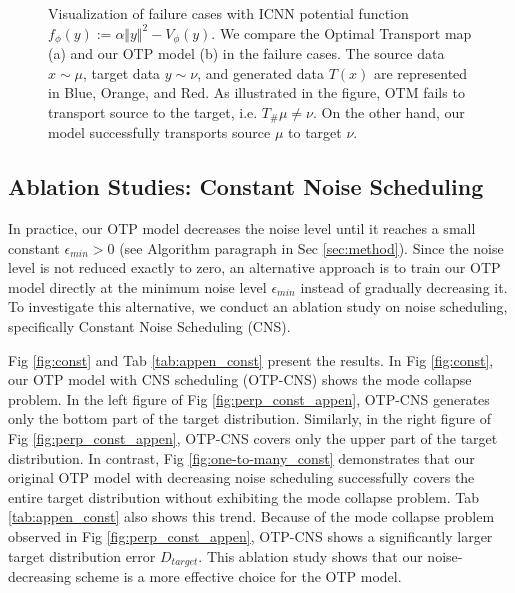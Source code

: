 \begin{figure}[h]
    \centering
    \hfill
    \vspace{-10pt}
    \caption{Visualization of failure cases with ICNN potential function $f_\phi(y) := \alpha \Vert y \Vert^2 - V_\phi(y)  $. We compare the Optimal Transport map (a) and our OTP model (b) in the failure cases. The source data $x \sim \mu$, target data $y \sim \nu$, and generated data $T(x)$ are represented in Blue, Orange, and Red. As illustrated in the figure, OTM fails to transport source to the target, i.e. $T_\# \mu \neq \nu$. On the other hand, our model successfully transports source $\mu$ to target $\nu$.}
    \label{fig:icnn}
\end{figure}

\subsection{Ablation Studies: Constant Noise Scheduling}
In practice, our OTP model decreases the noise level until it reaches a small constant $\epsilon_{min} > 0$ (see Algorithm paragraph in Sec \ref{sec:method}). Since the noise level is not reduced exactly to zero, an alternative approach is to train our OTP model directly at the minimum noise level $\epsilon_{min}$ instead of gradually decreasing it. To investigate this alternative, we conduct an ablation study on noise scheduling, specifically Constant Noise Scheduling (CNS).

Fig \ref{fig:const} and Tab \ref{tab:appen_const} present the results. In Fig \ref{fig:const}, our OTP model with CNS scheduling (OTP-CNS) shows the mode collapse problem. In the left figure of Fig \ref{fig:perp_const_appen}, OTP-CNS generates only the bottom part of the target distribution. Similarly, in the right figure of Fig \ref{fig:perp_const_appen}, OTP-CNS covers only the upper part of the target distribution. In contrast, Fig \ref{fig:one-to-many_const} demonstrates that our original OTP model with decreasing noise scheduling successfully covers the entire target distribution without exhibiting the mode collapse problem. Tab \ref{tab:appen_const} also shows this trend. Because of the mode collapse problem observed in Fig \ref{fig:perp_const_appen}, OTP-CNS shows a significantly larger target distribution error $D_{target}$. This ablation study shows that our noise-decreasing scheme is a more effective choice for the OTP model.


